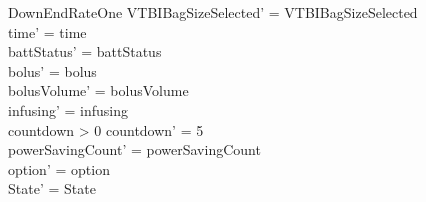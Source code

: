 \begin{schema}{DownEndRateOne}
	VTBIBagSizeSelected' = VTBIBagSizeSelected\\
	time' = time\\
	battStatus' = battStatus\\
	bolus' = bolus\\
	\pagebreak
	bolusVolume' = bolusVolume\\
	infusing' = infusing\\
	countdown > 0 \land countdown' = 5\\
	powerSavingCount' = powerSavingCount\\ 
	option' = option\\
	State' = State\\
\end{schema}